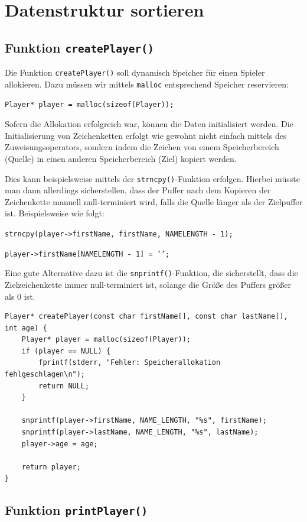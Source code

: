 \chapter{Datenstruktur sortieren}

\section*{Funktion \texttt{createPlayer()}}

Die Funktion \texttt{createPlayer()} soll dynamisch Speicher für einen
Spieler allokieren. Dazu müssen wir mittels \texttt{malloc} entsprechend
Speicher reservieren:

\noindent\texttt{Player* player = malloc(sizeof(Player));}

Sofern die Allokation erfolgreich war, können die Daten initialisiert werden.
Die Initialisierung von Zeichenketten erfolgt wie gewohnt nicht einfach mittels
des Zuweisungsoperators, sondern indem die Zeichen von einem Speicherbereich
(Quelle) in einen anderen Speicherbereich (Ziel) kopiert werden.

Dies kann beispielsweise mittels der \texttt{strncpy()}-Funktion
erfolgen. Hierbei müsste man dann allerdings sicherstellen, dass der Puffer nach
dem Kopieren der Zeichenkette manuell null-terminiert wird, falls die Quelle
länger als der Zielpuffer ist. Beispielsweise wie folgt:

\noindent\texttt{strncpy(player->firstName, firstName, NAMELENGTH - 1);}

\noindent\texttt{player->firstName[NAMELENGTH - 1] = '\0';}

Eine gute Alternative dazu ist die \texttt{snprintf()}-Funktion, die
sicherstellt, dass die Zielzeichenkette immer null-terminiert ist, solange die
Größe des Puffers größer als 0 ist.

\begin{verbatim}
Player* createPlayer(const char firstName[], const char lastName[], int age) {
    Player* player = malloc(sizeof(Player));
    if (player == NULL) {
        fprintf(stderr, "Fehler: Speicherallokation fehlgeschlagen\n");
        return NULL;
    }

    snprintf(player->firstName, NAME_LENGTH, "%s", firstName);
    snprintf(player->lastName, NAME_LENGTH, "%s", lastName);
    player->age = age;

    return player;
}
\end{verbatim}

\section*{Funktion \texttt{printPlayer()}}

